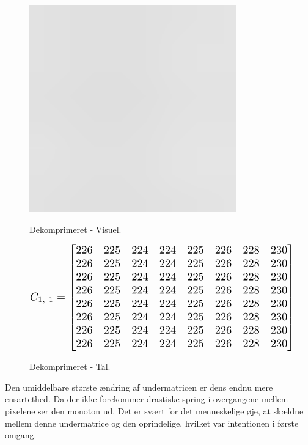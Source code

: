 \begin{figure}[htbp]
\begin{minipage}[b]{0.27\linewidth}
\centering
\includegraphics[width=0.8\textwidth]{Billeder/LenaAnvendelse/RED8x8/lena4-R8x8-compressed.png}
\caption{Dekomprimeret - Visuel.}
\label{fig:lena4-R8x8-compressed-visuel}
\end{minipage}
\hspace{0.5cm}
\begin{minipage}[b]{0.45\linewidth}
\centering
\[\resizebox{0.9\textwidth}{!}{$C_{1,\ 1}=\begin{bmatrix}
226 & 225 & 224 & 224 & 225 & 226 & 228 & 230 \\
226 & 225 & 224 & 224 & 225 & 226 & 228 & 230 \\
226 & 225 & 224 & 224 & 225 & 226 & 228 & 230 \\
226 & 225 & 224 & 224 & 225 & 226 & 228 & 230 \\
226 & 225 & 224 & 224 & 225 & 226 & 228 & 230 \\
226 & 225 & 224 & 224 & 225 & 226 & 228 & 230 \\
226 & 225 & 224 & 224 & 225 & 226 & 228 & 230 \\
226 & 225 & 224 & 224 & 225 & 226 & 228 & 230 \\
\end{bmatrix}$}\]
\caption{Dekomprimeret - Tal.}
\label{fig:lena4-R8x8-decompressed-matrix}
\end{minipage}
\end{figure}
Den umiddelbare største ændring af undermatricen er dens endnu mere ensartethed. Da der ikke forekommer drastiske spring i overgangene mellem pixelene ser den monoton ud. Det er svært for det menneskelige øje, at skældne mellem denne undermatrice og den oprindelige, hvilket var intentionen i første omgang. 

